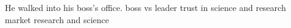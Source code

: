\documentclass[12pt, a4paper]{book}
\begin{document}
He walked into his boss's office. 
boss vs leader
trust in science and research
market research and science


\chapter{}


\chapter{}


\chapter{}


\chapter{}


\chapter{}


\chapter{}


\chapter{}


\chapter{}


\chapter{}


\chapter{}


\chapter{}


\chapter{}
\end{document}
